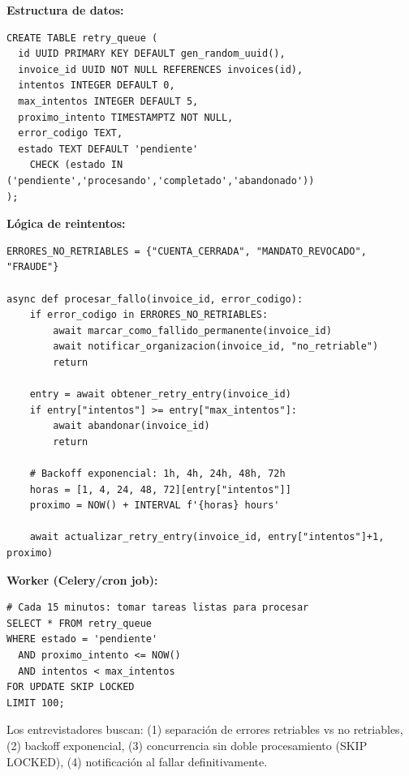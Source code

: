 \documentclass[11pt,a4paper]{article}
\begin{document}
\begin{respuestabox}
\textbf{Estructura de datos:}
\begin{lstlisting}[style=sql,numbers=none]
CREATE TABLE retry_queue (
  id UUID PRIMARY KEY DEFAULT gen_random_uuid(),
  invoice_id UUID NOT NULL REFERENCES invoices(id),
  intentos INTEGER DEFAULT 0,
  max_intentos INTEGER DEFAULT 5,
  proximo_intento TIMESTAMPTZ NOT NULL,
  error_codigo TEXT,
  estado TEXT DEFAULT 'pendiente'
    CHECK (estado IN ('pendiente','procesando','completado','abandonado'))
);
\end{lstlisting}

\textbf{Lógica de reintentos:}
\begin{lstlisting}[style=python,numbers=none]
ERRORES_NO_RETRIABLES = {"CUENTA_CERRADA", "MANDATO_REVOCADO", "FRAUDE"}

async def procesar_fallo(invoice_id, error_codigo):
    if error_codigo in ERRORES_NO_RETRIABLES:
        await marcar_como_fallido_permanente(invoice_id)
        await notificar_organizacion(invoice_id, "no_retriable")
        return

    entry = await obtener_retry_entry(invoice_id)
    if entry["intentos"] >= entry["max_intentos"]:
        await abandonar(invoice_id)
        return

    # Backoff exponencial: 1h, 4h, 24h, 48h, 72h
    horas = [1, 4, 24, 48, 72][entry["intentos"]]
    proximo = NOW() + INTERVAL f'{horas} hours'

    await actualizar_retry_entry(invoice_id, entry["intentos"]+1, proximo)
\end{lstlisting}

\textbf{Worker (Celery/cron job):}
\begin{lstlisting}[style=python,numbers=none]
# Cada 15 minutos: tomar tareas listas para procesar
SELECT * FROM retry_queue
WHERE estado = 'pendiente'
  AND proximo_intento <= NOW()
  AND intentos < max_intentos
FOR UPDATE SKIP LOCKED
LIMIT 100;
\end{lstlisting}
\end{respuestabox}

\begin{tipbox}
Los entrevistadores buscan: (1) separación de errores retriables vs no retriables,
(2) backoff exponencial, (3) concurrencia sin doble procesamiento (SKIP LOCKED),
(4) notificación al fallar definitivamente.
\end{tipbox}

\vspace{8pt}
\end{document}

